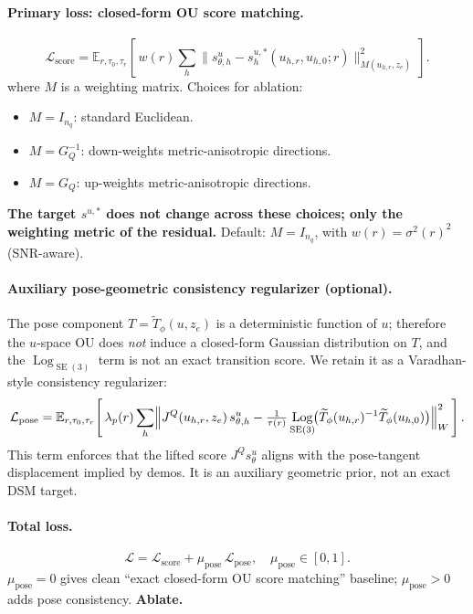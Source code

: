 \documentclass[11pt,a4paper]{article}
\DeclareMathOperator{\Log}{Log}
\DeclareMathOperator{\SE}{SE}
\newcommand{\E}{\mathbb{E}}
\newcommand{\Loss}{\mathcal{L}}
\newcommand{\JQ}{J^Q}
\newcommand{\GQ}{G_Q}
\begin{document}
\paragraph{Primary loss: closed-form OU score matching.}
\begin{equation}
\boxed{ \Loss_\text{score} = \E_{r, \tau_0, \tau_r}\!\left[\, w(r) \sum_h \bigl\| s_{\theta, h}^u - s^{u, *}_h(u_{h, r}, u_{h, 0}; r) \bigr\|_{M(u_{h, r}, z_e)}^2 \,\right]. }
\end{equation}
where $M$ is a weighting matrix. Choices for ablation:
\begin{itemize}[noitemsep]
    \item $M = I_{n_q}$: standard Euclidean.
    \item $M = \GQ^{-1}$: down-weights metric-anisotropic directions.
    \item $M = \GQ$: up-weights metric-anisotropic directions.
\end{itemize}
\textbf{The target $s^{u, *}$ does not change across these choices; only the weighting metric of the residual.} Default: $M = I_{n_q}$, with $w(r) = \sigma^2(r)^2$ (SNR-aware).

\paragraph{Auxiliary pose-geometric consistency regularizer (optional).} The pose component $T = \widetilde T_\phi(u, z_e)$ is a deterministic function of $u$; therefore the $u$-space OU does \emph{not} induce a closed-form Gaussian distribution on $T$, and the $\Log_{\SE(3)}$ term is not an exact transition score. We retain it as a Varadhan-style consistency regularizer:
\begin{equation}
\Loss_\text{pose} = \E_{r, \tau_0, \tau_r}\!\left[\, \lambda_p(r) \sum_h \Bigl\| \JQ(u_{h, r}, z_e)\, s_{\theta, h}^u - \tfrac{1}{\tau(r)} \Log_{\SE(3)}\!\bigl(\widetilde T_\phi(u_{h, r})^{-1} \widetilde T_\phi(u_{h, 0})\bigr) \Bigr\|_W^2 \,\right].
\end{equation}
This term enforces that the lifted score $\JQ s_\theta^u$ aligns with the pose-tangent displacement implied by demos. It is an auxiliary geometric prior, not an exact DSM target.

\paragraph{Total loss.}
\begin{equation}
\Loss = \Loss_\text{score} + \mu_\text{pose}\, \Loss_\text{pose}, \quad \mu_\text{pose} \in [0, 1].
\end{equation}
$\mu_\text{pose} = 0$ gives clean ``exact closed-form OU score matching'' baseline; $\mu_\text{pose} > 0$ adds pose consistency. \textbf{Ablate.}
\end{document}

